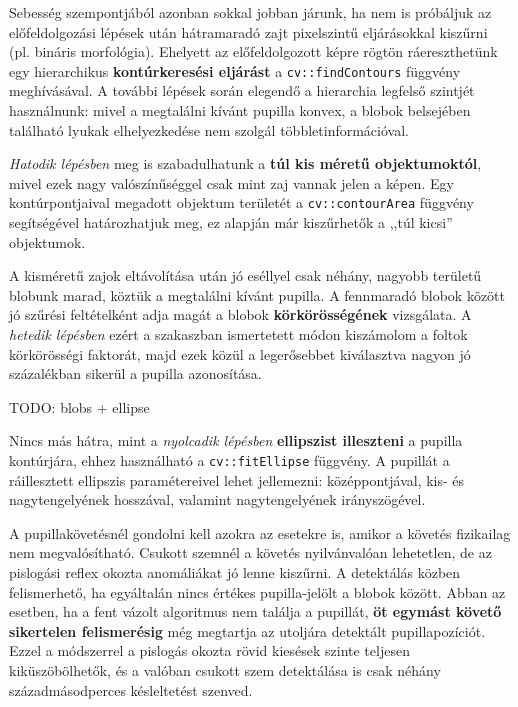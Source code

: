 Sebesség szempontjából azonban sokkal jobban járunk, ha nem is próbáljuk az előfeldolgozási lépések után hátramaradó zajt pixelszintű eljárásokkal kiszűrni (pl. bináris morfológia). Ehelyett az előfeldolgozott képre rögtön ráereszthetünk egy hierarchikus \textbf{kontúrkeresési eljárást} a \texttt{cv::findContours} függvény meghívásával. A további lépések során elegendő a hierarchia legfelső szintjét használnunk: mivel a megtalálni kívánt pupilla konvex, a blobok belsejében található lyukak elhelyezkedése nem szolgál többletinformációval.

\emph{Hatodik lépésben} meg is szabadulhatunk a \textbf{túl kis méretű objektumoktól}, mivel ezek nagy valószínűséggel csak mint zaj vannak jelen a képen. Egy kontúrpontjaival megadott objektum területét a \texttt{cv::contourArea} függvény segítségével határozhatjuk meg, ez alapján már kiszűrhetők a ,,túl kicsi'' objektumok.

A kisméretű zajok eltávolítása után jó eséllyel csak néhány, nagyobb területű blobunk marad, köztük a megtalálni kívánt pupilla. A fennmaradó blobok között jó szűrési feltételként adja magát a blobok \textbf{körkörösségének} vizsgálata. A \emph{hetedik lépésben} ezért a  szakaszban ismertetett módon kiszámolom a foltok körkörösségi faktorát, majd ezek közül a legerősebbet kiválasztva nagyon jó százalékban sikerül a pupilla azonosítása.

TODO: blobs + ellipse

Nincs más hátra, mint a \emph{nyolcadik lépésben} \textbf{ellipszist illeszteni} a pupilla kontúrjára, ehhez használható a \texttt{cv::fitEllipse} függvény. A pupillát a ráillesztett ellipszis paramétereivel lehet jellemezni: középpontjával, kis- és nagytengelyének hosszával, valamint nagytengelyének irányszögével.

\bigskip

A pupillakövetésnél gondolni kell azokra az esetekre is, amikor a követés fizikailag nem megvalósítható. Csukott szemnél a követés nyilvánvalóan lehetetlen, de az pislogási reflex okozta anomáliákat jó lenne kiszűrni. A detektálás közben felismerhető, ha egyáltalán nincs értékes pupilla-jelölt a blobok között. Abban az esetben, ha a fent vázolt algoritmus nem találja a pupillát, \textbf{öt egymást követő sikertelen felismerésig} még megtartja az utoljára detektált pupillapozíciót. Ezzel a módszerrel a pislogás okozta rövid kiesések szinte teljesen kiküszöbölhetők, és a valóban csukott szem detektálása is csak néhány századmásodperces késleltetést szenved.


